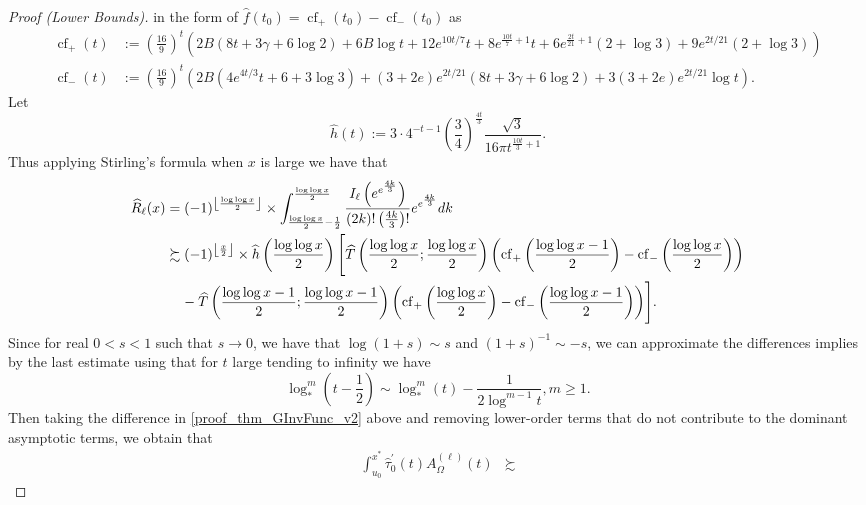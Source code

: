 \documentclass[11pt,reqno,a4letter]{article}
\numberwithin{figure}{section}
\numberwithin{table}{section}
\newcommand{\Floor}[2]{\ensuremath{\left\lfloor \frac{#1}{#2} \right\rfloor}}
\theoremstyle{plain}
\numberwithin{theorem}{section}
\theoremstyle{definition}
\begin{document}
\begin{proof}[Proof (Lower Bounds)]
in the form of $\widehat{f}(t_0) = \operatorname{cf}_{+}(t_0) - \operatorname{cf}_{-}(t_0)$ as 
\begin{align*}
\operatorname{cf}_{+}(t) & := \left(\frac{16}{9}\right)^t \left(2 B (8 t+3 \gamma +
     6 \log 2)+6 B \log t+12 e^{10 t/7} t+8 e^{\frac{10 t}{7}+1} t+6 e^{\frac{2 t}{21}+1}
     (2+\log 3)+9 e^{2 t/21} (2+\log 3)\right)\\ 
\operatorname{cf}_{-}(t) & := \left(\frac{16}{9}\right)^t \left(2 B \left(4 e^{4 t/3} t+6+3 
     \log 3\right)+(3+2 e) e^{2 t/21} (8 t+3 \gamma +6 \log 2)+3 (3+2 e) e^{2 t/21}
     \log t\right). 
\end{align*} 
Let 
\[
\widehat{h}(t) := 3 \cdot 4^{-t-1} \left(\frac{3}{4}\right)^{\frac{4t}{3}} \frac{\sqrt{3}}{ 
     16\pi t^{\frac{10t}{3}+1}}. 
\]
Thus applying Stirling's formula when $x$ is large we have that 
\begin{align} 
\label{proof_thm_GInvFunc_v2}  
\widehat{R}_{\ell}(x) & = (-1)^{\Floor{\log\log x}{2}} \times 
     \int_{\frac{\log\log x}{2}-\frac{1}{2}}^{\frac{\log\log x}{2}} 
     \frac{I_{\ell}\left(e^{e^{\frac{4k}{3}}}\right)}{(2k)! \left(\frac{4k}{3}\right)!} 
     e^{e^{\frac{4k}{3}}} dk \\ 
\notag 
     & \succsim (-1)^{\Floor{x}{2}} \times \widehat{h}\left(\frac{\log\log x}{2}\right) \Biggl[ 
     \widehat{T}\left(\frac{\log\log x}{2}; \frac{\log\log x}{2}\right) \left( 
     \operatorname{cf}_{+}\left(\frac{\log\log x-1}{2}\right) - 
     \operatorname{cf}_{-}\left(\frac{\log\log x}{2}\right)
     \right) \\ 
\notag 
     & \phantom{\succsim\ } - 
     \widehat{T}\left(\frac{\log\log x-1}{2}; \frac{\log\log x-1}{2}\right) \left( 
     \operatorname{cf}_{+}\left(\frac{\log\log x}{2}\right) - 
     \operatorname{cf}_{-}\left(\frac{\log\log x-1}{2}\right)
     \right) 
     \Biggr]. 
\end{align} 
Since for real $0 < s < 1$ such that $s \rightarrow 0$, we have that $\log(1+s) \sim s$ and 
$(1+s)^{-1} \sim -s$, we can approximate the differences implies by the last estimate using that 
for $t$ large tending to infinity we have 
\[
     \log_{\ast}^m\left(t - \frac{1}{2}\right) \sim \log_{\ast}^{m}(t) - 
     \frac{1}{2 \log^{m-1} t}, m \geq 1. 
\]
Then taking the difference in \eqref{proof_thm_GInvFunc_v2} above and removing lower-order terms that 
do not contribute to the dominant asymptotic terms, we obtain that 
\begin{align} 
\label{proof_thm_GInvFunc_v3} 
\int_{u_0}^{x^{\ast}} \widehat{\tau}_0^{\prime}(t) A_{\Omega}^{(\ell)}(t) & \succsim 

\end{align}
\end{proof}
\end{document}
